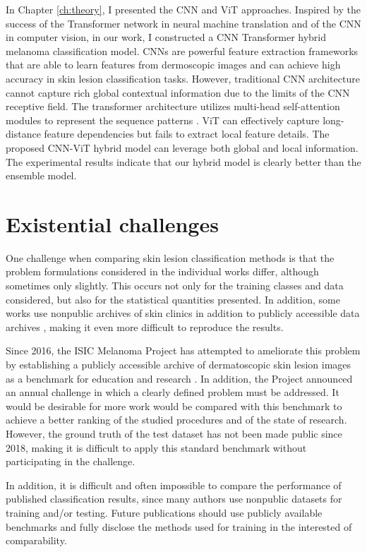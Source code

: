 In Chapter \ref{ch:theory}, I presented the CNN and ViT approaches.  Inspired by the success of the Transformer network in neural machine translation and of the CNN in computer vision, in our work, I constructed a CNN Transformer hybrid melanoma classification model. CNNs are powerful feature extraction frameworks that are able to learn features from dermoscopic images and can achieve high accuracy in skin lesion classification tasks. However, traditional CNN architecture cannot capture rich global contextual information due to the limits of the CNN receptive field. The transformer architecture utilizes multi-head self-attention modules to represent the sequence patterns \cite{li2020cnn}. ViT can effectively capture long-distance feature dependencies but fails to extract local feature details. The proposed CNN-ViT hybrid model can leverage both global and local information.  The experimental results indicate that our hybrid model is clearly better than the ensemble model.

\section{Existential challenges}

One challenge when comparing skin lesion classification methods is that the problem formulations considered in the individual works differ, although sometimes only slightly. This occurs not only for the training classes and data considered, but also for the  statistical quantities presented. In addition, some works use nonpublic archives of skin clinics in addition to publicly accessible data archives \cite{haenssle2018man,esteva2017dermatologist}, making it even more difficult to reproduce the results.

Since 2016, the ISIC Melanoma Project has attempted to ameliorate this problem  by establishing a publicly accessible archive of dermatoscopic skin lesion images as a benchmark for education and research \cite{gutman2016skin}. In addition, the Project announced an annual challenge in which a clearly defined problem must be addressed. It would be desirable for more work would be compared with this benchmark to achieve a better ranking of the studied procedures and of the state of research. However, the ground truth of the test dataset has not been made public since 2018, making it is difficult to apply this standard benchmark without participating in the challenge.

In addition, it is difficult and often impossible to compare the performance of published classification results, since many authors use nonpublic datasets for training and/or testing. Future publications should use publicly available benchmarks and fully disclose the methods used for training in the interested of comparability.

